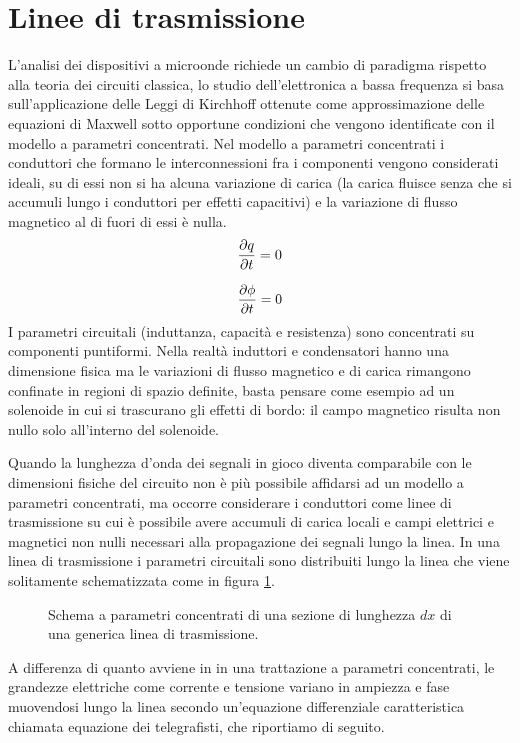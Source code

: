 \documentclass[12pt,oneside]{book}
\begin{document}
\section{Linee di trasmissione}
L'analisi dei dispositivi a microonde richiede un cambio di paradigma rispetto alla teoria dei circuiti classica, lo studio dell'elettronica a bassa frequenza si basa sull'applicazione delle Leggi di Kirchhoff ottenute come approssimazione delle equazioni di Maxwell sotto opportune condizioni che vengono identificate con il modello a parametri concentrati.
Nel modello a parametri concentrati i conduttori che formano le interconnessioni fra i componenti vengono considerati ideali, su di essi non si ha alcuna variazione di carica (la carica fluisce senza che si accumuli lungo i conduttori per effetti capacitivi) e la variazione di flusso magnetico al di fuori di essi è nulla.
\begin{equation}
    \pdv{q}{t}=0
\end{equation}

\begin{equation}
    \pdv{\phi}{t}=0
\end{equation}
I parametri circuitali (induttanza, capacità e resistenza) sono concentrati su componenti puntiformi. Nella realtà induttori e condensatori hanno una dimensione fisica ma le variazioni di flusso magnetico e di carica rimangono confinate in regioni di spazio definite, basta pensare come esempio ad un solenoide in cui si trascurano gli effetti di bordo: il campo magnetico risulta non nullo solo all'interno del solenoide.

Quando la lunghezza d'onda dei segnali in gioco diventa comparabile con le dimensioni fisiche del circuito non è più possibile affidarsi ad un modello a parametri concentrati, ma occorre considerare i conduttori come linee di trasmissione su cui è possibile avere accumuli di carica locali e campi elettrici e magnetici non nulli necessari alla propagazione dei segnali lungo la linea.
In una linea di trasmissione i parametri circuitali sono distribuiti lungo la linea che viene solitamente schematizzata come in figura \ref{trasmission_line}.
\begin{figure}[!htbp]
    \centering
    
    \caption{Schema a parametri concentrati di una sezione di lunghezza $dx$ di una generica linea di trasmissione.}
    \label{trasmission_line}
\end{figure} 
A differenza di quanto avviene in in una trattazione a parametri concentrati, le grandezze elettriche come corrente e tensione variano in ampiezza e fase muovendosi lungo la linea secondo un'equazione differenziale caratteristica chiamata equazione dei telegrafisti, che riportiamo di seguito.
\end{document}
